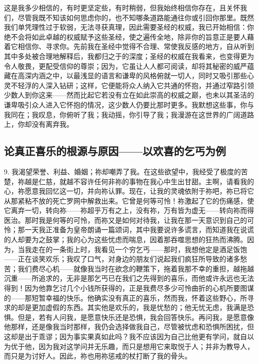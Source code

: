这是我多少相信的，有时更坚定些，有时稍弱，但我始终相信你存在，且关怀我们，尽管我既不知该如何思虑你的，也不知哪条道路能通往你或引回你那里。既然我们单凭理性过于软弱，无法寻获真理，因此需要圣经的权威，我已开始相信：你绝不会将如此卓越的权威赋予这些圣经，使之遍传全地，除非你的旨意正是要人藉着它相信你、寻求你。先前我在圣经中觉得不合理、常使我反感的地方，自从听到其中多处被合理地解释后，我都归之于的深度；圣经的权威在我看来，也变得更为令人敬畏，更配受信仰的尊崇；因为，它虽让人人都可阅读，却将其秘密的威严蕴藏在高深内涵之中，以最浅显的语言和谦卑的风格俯就一切人，同时又吸引那些心灵不轻浮的人深入钻研；这样，它便能将众人纳入它共通的怀抱，并通过窄路引领少数人到你这来——然而比起它若没有立在如此崇高的权威之巅，也未以其圣洁的谦卑吸引众人进入它怀抱的情况，这少数人仍要比那时更多。我默想这些事，你与我同在；我叹息，你俯听了我；我动摇，你引导了我；我漫游在这世界的广阔道路上，你却没有离弃我。\par


\subsection{论真正喜乐的根源与原因——以欢喜的乞丐为例}

9. 我渴望荣誉、利益、婚姻；祢却嘲弄了我。在这些欲望中，我经受了极度的苦楚，祢越是仁慈，就越不容许任何非祢的事物在我心中生出甘甜。主啊，请看我的心，祢愿意我回忆这一切，并向祢认罪。现在，让我的灵魂依附于祢吧，祢已将它从那紧粘不放的死亡罗网中解救出来。它曾是何等可怜！祢激起了它的伤痛感，使它离弃一切，转向祢——祢超乎万有之上，没有祢，万有皆为虚无——转向祢而得医治。那时我是何等的可怜，而祢又是如何对待我，让我在那一天意识到自己的可怜；那一天我正准备为皇帝朗诵一篇颂词，其中我要说许多谎言，而知道我在说谎的人却要为之鼓掌；我的心为这些忧虑而喘息，因着那吞噬思想的狂热而沸腾。因为，当我走在的一条街上时，我看见一个穷乞丐——那时，我想他定是酒足饭饱——正在谈笑欢乐；我叹了口气，对身边的朋友们说起我们疯狂所导致的诸多愁苦；我们费尽心机——就像我当时在欲念的鞭策下，拖着我那不幸的重担，越拖越沉重——所追求的，无非是那乞丐已在我们之先得到的喜乐，而他或许永远也无法得到！因为他靠乞讨几个小钱所获得的，正是我费尽多少可怜曲折的心机所要图谋的——那短暂幸福的快乐。他确实没有真正的喜乐，然而我，怀着这些野心，所寻求的却是更加虚假的东西。其实他是欢乐的，我是忧愁的；他无忧无虑，我满是恐惧。但是，若有人问我，是愿意快乐还是恐惧，我会回答快乐。再问我，是愿意像他那样，还是像我当时那样，我仍会选择做我自己，尽管被忧虑和恐惧所困扰，但这却是出于乖谬；因为事实果真如此吗？我不应该因为自己比他更有学问，就自以为优于他，因为我对这学问并无乐趣，而只是想用它来取悦于人；并非为教导人，而只是为讨好人。因此，祢也用祢惩戒的杖打断了我的骨头。\par

